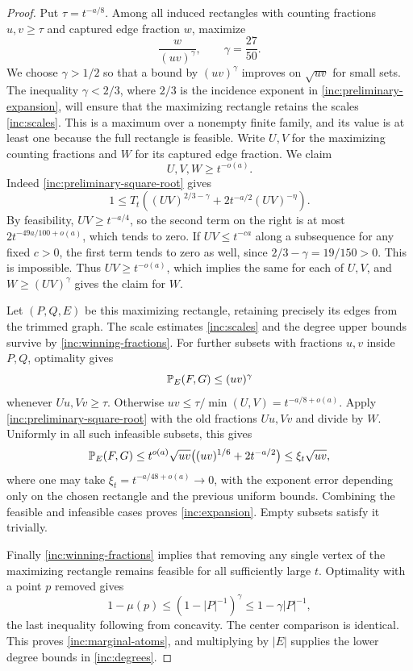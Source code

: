 \begin{proof}
Put \(\tau=t^{-a/8}\). Among all induced rectangles with counting
fractions \(u,v\ge\tau\) and captured edge fraction \(w\), maximize
\[
 \frac{w}{(uv)^\gamma},\qquad \gamma=\frac{27}{50}.
\]
We choose \(\gamma>1/2\) so that a bound by \((uv)^\gamma\)
improves on \(\sqrt{uv}\) for small sets. The inequality
\(\gamma<2/3\), where \(2/3\) is the incidence exponent in
\eqref{inc:preliminary-expansion}, will ensure that the maximizing
rectangle retains the scales \eqref{inc:scales}.
This is a maximum over a nonempty finite family, and its value is at
least one because the full rectangle is feasible. Write \(U,V\)
for the maximizing counting fractions and \(W\) for its captured
edge fraction. We claim
\begin{equation}\label{inc:winning-fractions}
 U,V,W\ge t^{-o(a)}.
\end{equation}
Indeed \eqref{inc:preliminary-square-root} gives
\[
 1\le T_t\left((UV)^{2/3-\gamma}
       +2t^{-a/2}(UV)^{-\eta}\right).
\]
By feasibility, \(UV\ge t^{-a/4}\), so the second term on the right
is at most \(2t^{-49a/100+o(a)}\), which tends to zero. If
\(UV\le t^{-ca}\) along a subsequence for any fixed \(c>0\), the
first term tends to zero as well, since
\(2/3-\gamma=19/150>0\). This is impossible. Thus
\(UV\ge t^{-o(a)}\), which implies the same for each of \(U,V\),
and \(W\ge(UV)^\gamma\) gives the claim for \(W\).

Let \((P,Q,E)\) be this maximizing rectangle, retaining precisely its
edges from the trimmed graph. The scale estimates
\eqref{inc:scales} and the degree upper bounds survive by
\eqref{inc:winning-fractions}. For further subsets with fractions
\(u,v\) inside \(P,Q\), optimality gives
\[
 \mathbb P_E(F,G)\le(uv)^\gamma
\]
whenever \(Uu,Vv\ge\tau\). Otherwise
\(uv\le\tau/\min(U,V)=t^{-a/8+o(a)}\). Apply
\eqref{inc:preliminary-square-root} with the old fractions \(Uu,Vv\)
and divide by \(W\). Uniformly in all such infeasible subsets, this
gives
\[
 \mathbb P_E(F,G)
 \le t^{o(a)}\sqrt{uv}
       \bigl((uv)^{1/6}+2t^{-a/2}\bigr)
 \le\xi_t\sqrt{uv},
\]
where one may take \(\xi_t=t^{-a/48+o(a)}\to0\), with the exponent
error depending only on the chosen rectangle and the previous uniform
bounds. Combining the feasible and infeasible cases proves
\eqref{inc:expansion}. Empty subsets satisfy it trivially.

Finally \eqref{inc:winning-fractions} implies that removing any single
vertex of the maximizing rectangle remains feasible for all sufficiently
large \(t\). Optimality with a point \(p\) removed gives
\[
 1-\mu(p)\le(1-|P|^{-1})^\gamma\le1-\gamma|P|^{-1},
\]
the last inequality following from concavity. The center comparison is
identical. This proves \eqref{inc:marginal-atoms}, and multiplying by
\(|E|\) supplies the lower degree bounds in \eqref{inc:degrees}.
\end{proof}

